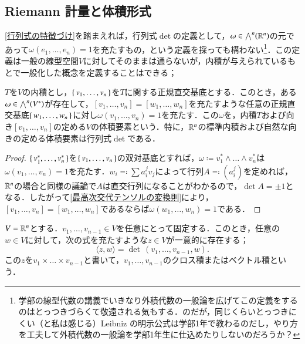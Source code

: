 \subsection{Riemann 計量と体積形式}

\cref{行列式の特徴づけ}を踏まえれば，行列式$\det$の定義として，$\omega \in \bigwedge^n(\mathbb{R}^n)$の元であって$\omega(e_1, \dots, e_n) = 1$を充たすもの，という定義を採っても構わない\footnote{学部の線型代数の講義でいきなり外積代数の一般論を広げてこの定義をするのはとっつきづらくて敬遠される気もする．のだが，同じくらいとっつきにくい（と私は感じる）Leibniz の明示公式は学部1年で教わるのだし，やり方を工夫して外積代数の一般論を学部1年生に仕込めたりしないのだろうか？}．この定義は一般の線型空間$V$に対してそのままは通らないが，内積が与えられているもとで一般化した概念を定義することはできる；

\begin{thm}
$T$を$V$の内積とし，$\set{v_1, \dots, v_n}$を$T$に関する正規直交基底とする．このとき，ある$\omega \in \bigwedge^n(V^*)$が存在して，$[v_1, \dots, v_n] = [w_1, \dots, w_n]$を充たすような任意の正規直交基底$\set{w_1, \dots, w_n}$に対し$\omega (v_1, \dots, v_n) = 1$を充たす．この$\omega$を，内積$T$および向き$[v_1, \dots, v_n]$の定める$V$の体積要素という．特に，$\mathbb{R}^n$の標準内積および自然な向きの定める体積要素は行列式$\det$である．
\end{thm}

\begin{proof}
$\set{v_1^*, \dots, v_n^*}$を$\set{v_1, \dots ,v_n}$の双対基底とすれば，$\omega \coloneqq v_1^* \wedge \dots \wedge v_n^*$は$\omega(v_1, \dots ,v_n) = 1$を充たす．$w_i \eqqcolon \sum a_i^j v_j$によって行列$A \eqqcolon \left(a_i^j\right)$を定めれば，$\mathbb{R}^n$の場合と同様の議論で$A$は直交行列になることがわかるので，$\det A = \pm 1$となる．したがって\cref{最高次交代テンソルの変換則}により，$[v_1, \dots, v_n] = [w_1, \dots, w_n]$であるならば$\omega(w_1, \dots, w_n) = 1$である．
\end{proof}

\begin{prop}
$V = \mathbb{R}^n$とする．$v_1, \dots, v_{n-1} \in V$を任意にとって固定する．このとき，任意の$w \in V$に対して，次の式を充たすような$z \in V$が一意的に存在する；
\begin{equation}
\langle z,w \rangle = \det\, (v_1, \dots, v_{n-1}, w).
\end{equation}この$z$を$v_1 \times \dots \times v_{n-1}$と書いて，$v_1, \dots, v_{n-1}$のクロス積またはベクトル積という．
\end{prop}

